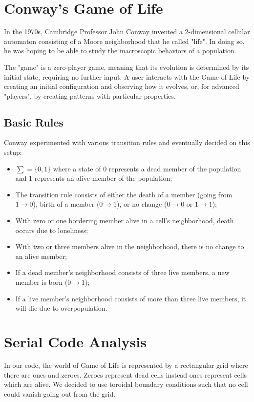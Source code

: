 \documentclass[a4paper,11pt,twoside]{report}
\begin{document}
\chapter{Conway's Game of Life}\label{Conway}

In the 1970s, Cambridge Professor John Conway invented a 2-dimensional cellular automaton consisting of a Moore neighborhood that he called "life". In doing so, he was hoping to be able to study the macroscopic behaviors of a population.

\noindent The "game" is a zero-player game, meaning that its evolution is determined by its initial state, requiring no further input. A user interacts with the Game of Life by creating an initial configuration and observing how it evolves, or, for advanced "players", by creating patterns with particular properties.

\section{Basic Rules}
Conway experimented with various transition rules and eventually decided on this setup:
\begin{itemize}
	\item $\sum = \{0, 1\}$ where a state of 0 represents a dead member of the population and 1 represents an alive member of the population;
	\item The transition rule consists of either the death of a member (going from $1 \rightarrow 0$), birth of a member ($0 \rightarrow 1$), or no change ($0 \rightarrow 0$ or $1 \rightarrow 1$);
	\item With zero or one bordering member alive in a cell's neighborhood, death occurs due to loneliness;
	\item With two or three members alive in the neighborhood, there is no change to an alive member;
	\item If a dead member's neighborhood consists of three live members, a new member is born ($0 \rightarrow 1$);
	\item If a live member's neighborhood consists of more than three live members, it will die due to overpopulation.
\end{itemize}


\chapter {Serial Code Analysis}

In our code, the world of Game of Life is represented by a rectangular grid where there are ones and zeroes. Zeroes represent dead cells instead ones represent cells which are alive. We decided to use toroidal boundary conditions such that no cell could vanish going out from the grid.
\end{document}
